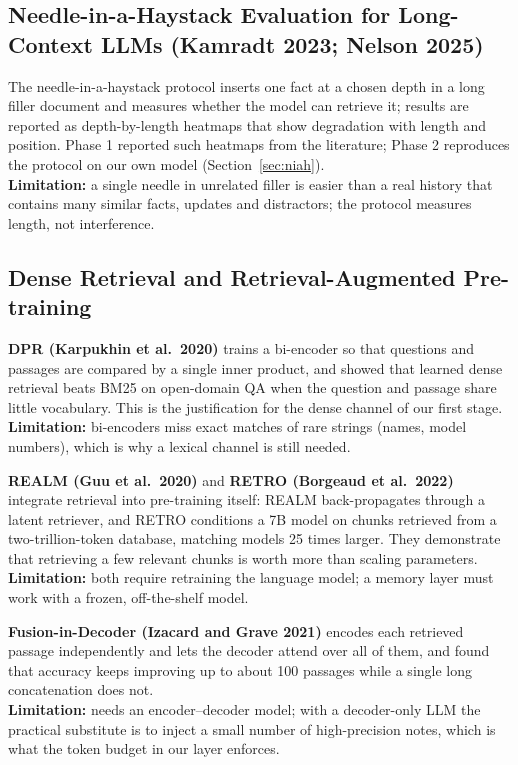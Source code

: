 \subsection{Needle-in-a-Haystack Evaluation for Long-Context LLMs (Kamradt 2023; Nelson 2025)}
The needle-in-a-haystack protocol \cite{niah2025} inserts one fact at a chosen depth in a long filler
document and measures whether the model can retrieve it; results are reported as depth-by-length heatmaps
that show degradation with length and position. Phase 1 reported such heatmaps from the literature; Phase
2 reproduces the protocol on our own model (Section~\ref{sec:niah}). \\
\textbf{Limitation:} a single needle in unrelated filler is easier than a real history that contains many
similar facts, updates and distractors; the protocol measures length, not interference.

\subsection{Dense Retrieval and Retrieval-Augmented Pre-training}
\textbf{DPR (Karpukhin et al.\ 2020)} \cite{dpr} trains a bi-encoder so that questions and passages are
compared by a single inner product, and showed that learned dense retrieval beats BM25 on open-domain QA
when the question and passage share little vocabulary. This is the justification for the dense channel of
our first stage. \\
\textbf{Limitation:} bi-encoders miss exact matches of rare strings (names, model numbers), which is why a
lexical channel is still needed.

\textbf{REALM (Guu et al.\ 2020)} \cite{realm} and \textbf{RETRO (Borgeaud et al.\ 2022)} \cite{retro}
integrate retrieval into pre-training itself: REALM back-propagates through a latent retriever, and RETRO
conditions a 7B model on chunks retrieved from a two-trillion-token database, matching models 25 times
larger. They demonstrate that retrieving a few relevant chunks is worth more than scaling parameters. \\
\textbf{Limitation:} both require retraining the language model; a memory layer must work with a frozen,
off-the-shelf model.

\textbf{Fusion-in-Decoder (Izacard and Grave 2021)} \cite{fid} encodes each retrieved passage
independently and lets the decoder attend over all of them, and found that accuracy keeps improving up to
about 100 passages while a single long concatenation does not. \\
\textbf{Limitation:} needs an encoder--decoder model; with a decoder-only LLM the practical substitute is
to inject a small number of high-precision notes, which is what the token budget in our layer enforces.

